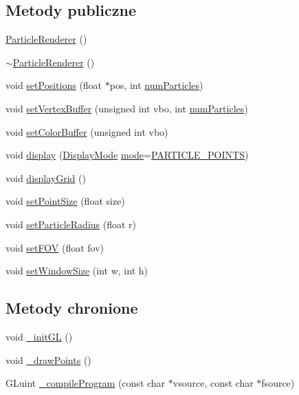 \subsection*{Metody publiczne}
\begin{DoxyCompactItemize}
\item 
\hyperlink{class_particle_renderer_a1718484686c2e6db488cc88c433d03cc}{Particle\-Renderer} ()
\item 
\hyperlink{class_particle_renderer_a281be31ad850fead012460fb6675db98}{$\sim$\-Particle\-Renderer} ()
\item 
void \hyperlink{class_particle_renderer_adb3204e8af23a65b05b1aca7f43f0430}{set\-Positions} (float $\ast$pos, int \hyperlink{particles_8cpp_a05b8a90212054a3eb1a036ae0c269596}{num\-Particles})
\item 
void \hyperlink{class_particle_renderer_a9c0d44ba7666ab432004a5df4cbb2b59}{set\-Vertex\-Buffer} (unsigned int vbo, int \hyperlink{particles_8cpp_a05b8a90212054a3eb1a036ae0c269596}{num\-Particles})
\item 
void \hyperlink{class_particle_renderer_af16e23ebcee20753d86d24e4e5e32c7c}{set\-Color\-Buffer} (unsigned int vbo)
\item 
void \hyperlink{class_particle_renderer_a80b2f52dc28bb3abbde021f7fe96f8ff}{display} (\hyperlink{class_particle_renderer_a7b691afffd1abe415cb0ce17fd26f3d5}{Display\-Mode} \hyperlink{particles_8cpp_a1ea5d0cb93f22f7d0fdf804bd68c3326}{mode}=\hyperlink{class_particle_renderer_a7b691afffd1abe415cb0ce17fd26f3d5a76d84afc3ec5c09bff035fe798dacbbe}{P\-A\-R\-T\-I\-C\-L\-E\-\_\-\-P\-O\-I\-N\-T\-S})
\item 
void \hyperlink{class_particle_renderer_a0e0a5d323acf55087911ea77a2a3eafa}{display\-Grid} ()
\item 
void \hyperlink{class_particle_renderer_a68df35cdf53ad987aa6d8360b3531627}{set\-Point\-Size} (float size)
\item 
void \hyperlink{class_particle_renderer_aff09822b565b6953fc83c88bda7fa378}{set\-Particle\-Radius} (float r)
\item 
void \hyperlink{class_particle_renderer_ad6da663d3073401a776edb8dc6cf4d5f}{set\-F\-O\-V} (float fov)
\item 
void \hyperlink{class_particle_renderer_ad84b464475e5ebd42cfed6e2e91e7247}{set\-Window\-Size} (int w, int h)
\end{DoxyCompactItemize}
\subsection*{Metody chronione}
\begin{DoxyCompactItemize}
\item 
void \hyperlink{class_particle_renderer_ac75c7f73a0014333305b174b8863a46b}{\-\_\-init\-G\-L} ()
\item 
void \hyperlink{class_particle_renderer_a2683c43c010bff7973a977c1953f2bd6}{\-\_\-draw\-Points} ()
\item 
G\-Luint \hyperlink{class_particle_renderer_a3a7af352d38734b6bfa425e3b207d60b}{\-\_\-compile\-Program} (const char $\ast$vsource, const char $\ast$fsource)
\end{DoxyCompactItemize}
